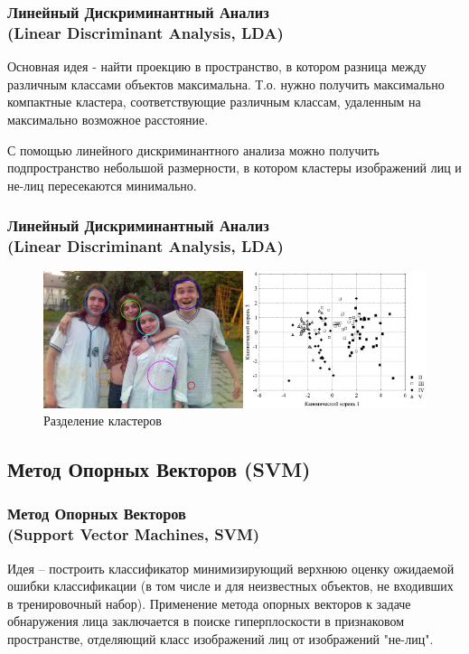 \documentclass{beamer}
\begin{document}
\begin{frame}
\frametitle{Линейный Дискриминантный Анализ\\(Linear Discriminant Analysis, LDA)}

Основная идея - найти проекцию в пространство, в котором разница между различным классами объектов максимальна. Т.о. нужно получить максимально компактные кластера, соответствующие различным классам, удаленным на максимально возможное расстояние.
\bigskip

С помощью линейного дискриминантного анализа можно получить подпространство небольшой размерности, в котором кластеры изображений лиц и не-лиц пересекаются минимально.

\end{frame}

\begin{frame}
\frametitle{Линейный Дискриминантный Анализ\\(Linear Discriminant Analysis, LDA)}

\begin{figure}
\includegraphics[scale=0.65]{res/img05}
\caption{Разделение кластеров}
\end{figure}

\end{frame}

\subsection{Метод Опорных Векторов (SVM)}

\begin{frame}
\frametitle{Метод Опорных Векторов\\(Support Vector Machines, SVM)}

Идея -- построить классификатор минимизирующий верхнюю оценку ожидаемой ошибки классификации (в том числе и для неизвестных объектов, не входивших в тренировочный набор). Применение метода опорных векторов к задаче обнаружения лица заключается в поиске гиперплоскости в признаковом пространстве, отделяющий класс изображений лиц от изображений "не-лиц". 

\end{frame}
\end{document}
